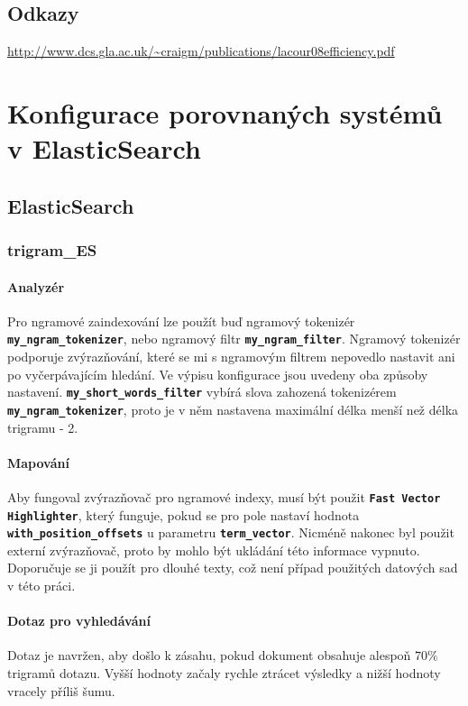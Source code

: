 \documentclass[11pt,letterpaper,oneside,openright]{book}
\newcommand{\bftt}[1]{\texttt{\textbf{#1}}}
\begin{document}
\section*{Odkazy}
\url{http://www.dcs.gla.ac.uk/~craigm/publications/lacour08efficiency.pdf}

\medskip



\appendix
\chapter{Konfigurace porovnaných systémů v ElasticSearch}\label{appendix:search_config}
\section{ElasticSearch}
\subsection{trigram\_ES}
\subsubsection{Analyzér}
Pro ngramové zaindexování lze použít buď ngramový tokenizér
\bftt{my\_ngram\_tokenizer}, nebo ngramový filtr \bftt{my\_ngram\_filter}.
Ngramový tokenizér podporuje zvýrazňování, které se mi s ngramovým filtrem
nepovedlo nastavit ani po vyčerpávajícím hledání. Ve výpisu konfigurace jsou
uvedeny oba způsoby nastavení. \bftt{my\_short\_words\_filter} vybírá slova
zahozená tokenizérem \bftt{my\_ngram\_tokenizer}, proto je v něm nastavena
maximální délka menší než délka trigramu - 2.



\subsubsection{Mapování}
Aby fungoval zvýrazňovač pro ngramové indexy, musí být použit \bftt{Fast
Vector Highlighter}, který funguje, pokud se pro pole nastaví hodnota
\bftt{with\_position\_offsets} u parametru \bftt{term\_vector}. Nicméně
nakonec byl použit externí zvýrazňovač, proto by mohlo být ukládání této
informace vypnuto. Doporučuje se ji použít pro dlouhé texty, což není
případ použitých datových sad v této práci.



\subsubsection{Dotaz pro vyhledávání}
Dotaz je navržen, aby došlo k zásahu, pokud dokument obsahuje alespoň
$70\%$ trigramů dotazu. Vyšší hodnoty začaly rychle ztrácet výsledky a
nižší hodnoty vracely příliš šumu.
\end{document}
